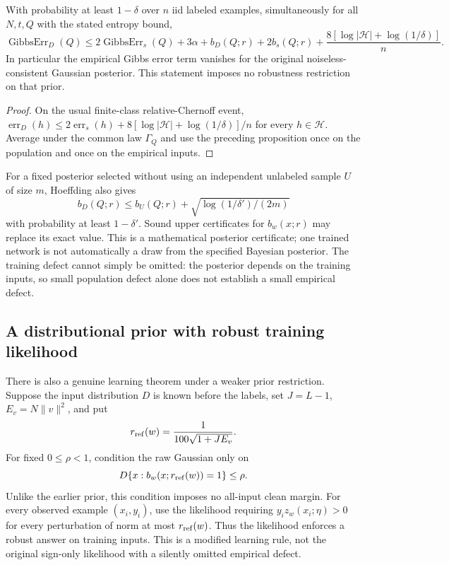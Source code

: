 \begin{theorem}
With probability at least $1-\delta$ over $n$ iid labeled examples,
simultaneously for all $N,t,Q$ with the stated entropy bound,
\[
 \operatorname{GibbsErr}_D(Q)
 \le 2\operatorname{GibbsErr}_s(Q)+3\alpha+b_D(Q;r)+2b_s(Q;r)
       +\frac{8[\log|\mathcal H|+\log(1/\delta)]}{n}.
\]
In particular the empirical Gibbs error term vanishes for the original
noiseless-consistent Gaussian posterior. This statement imposes no
robustness restriction on that prior.
\end{theorem}
\begin{proof}
On the usual finite-class relative-Chernoff event,
$\operatorname{err}_D(h)\le2\operatorname{err}_s(h)
+8[\log|\mathcal H|+\log(1/\delta)]/n$ for every $h\in\mathcal H$.
Average under the common law $\Gamma_Q$ and use the preceding proposition
once on the population and once on the empirical inputs.
\end{proof}

For a fixed posterior selected without using an independent unlabeled
sample $U$ of size $m$, Hoeffding also gives
\[
 b_D(Q;r)\le b_U(Q;r)+\sqrt{\log(1/\delta')/(2m)}
\]
with probability at least $1-\delta'$. Sound upper certificates for
$b_w(x;r)$ may replace its exact value. This is a mathematical posterior
certificate; one trained network is not automatically a draw from the
specified Bayesian posterior. The training defect cannot simply be omitted:
the posterior depends on the training inputs, so small population defect
alone does not establish a small empirical defect.

\subsection{A distributional prior with robust training likelihood}
There is also a genuine learning theorem under a weaker prior restriction.
Suppose the input distribution $D$ is known before the labels, set
$J=L-1$, $E_v=N\|v\|^2$, and put
\[
 r_{\rm ref}(w)=\frac{1}{100\sqrt{1+J E_v}}.
\]
For fixed $0\le\rho<1$, condition the raw Gaussian only on
\[
 D\{x:b_w(x;r_{\rm ref}(w))=1\}\le\rho.
\]
Unlike the earlier prior, this condition imposes no all-input clean margin.
For every observed example $(x_i,y_i)$, use the likelihood requiring
$y_i z_w(x_i;\eta)>0$ for every perturbation of norm at most
$r_{\rm ref}(w)$. Thus the likelihood enforces a robust answer on training
inputs. This is a modified learning rule, not the original sign-only
likelihood with a silently omitted empirical defect.

